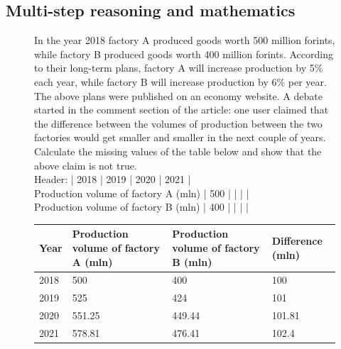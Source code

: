 \subsection{Multi-step reasoning and mathematics}
\vspace{-5mm}
\begin{figure}[!h]
 \noindent\begin{tcolorbox}[nobeforeafter, title=Prompt, colframe=darkgray, colback=white]

In the year 2018 factory A produced goods worth 500 million forints, while factory B produced goods worth 400 million forints. According to their long-term plans, factory A will increase production by 5\% each year, while factory B will increase production by 6\% per year.\\

The above plans were published on an economy website. A debate started in the comment section of the article: one user claimed that the difference between the volumes of production between the two factories would get smaller and smaller in the next couple of years.\\

Calculate the missing values of the table below and show that the above claim is not true.\\

Header: | 2018 | 2019 | 2020 | 2021 |\\
Production volume of factory A (mln) | 500 |   |   |   |\\
Production volume of factory B (mln) | 400 |   |   |   |

\end{tcolorbox}

\noindent\begin{tcolorbox}[nobeforeafter, title=Model Response (rendered Markdown), colframe=darkgray, colback=white]

\begin{tabular}{|p{1.5cm}|p{4cm}|p{4cm}|p{2.5cm}|}
\hline
\textbf{Year} & \textbf{Production volume of factory A (mln)} & \textbf{Production volume of factory B (mln)} & \textbf{Difference (mln)} \\ \hline
2018 & 500 & 400 & 100 \\ \hline
2019 & 525 & 424 & 101 \\ \hline
2020 & 551.25 & 449.44 & 101.81 \\ \hline
2021 & 578.81 & 476.41 & 102.4 \\ \hline
\end{tabular}\\


\end{tcolorbox}
\end{figure}
